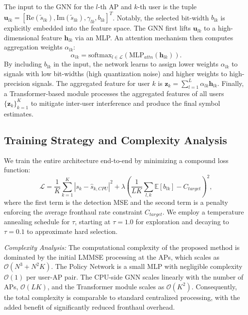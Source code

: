 The input to the GNN for the $l$-th AP and $k$-th user is the tuple $\mathbf{u}_{lk} = [\text{Re}(\tilde{s}_{lk}), \text{Im}(\tilde{s}_{lk}), \gamma_{lk}, b_{lk}]^T$. Notably, the selected bit-width $b_{lk}$ is explicitly embedded into the feature space. The GNN first lifts $\mathbf{u}_{lk}$ to a high-dimensional feature $\mathbf{h}_{lk}$ via an MLP. An attention mechanism then computes aggregation weights $\alpha_{lk}$:
\begin{equation}
    \alpha_{lk} = \text{softmax}_{l \in \mathcal{L}} \left( \text{MLP}_{attn}(\mathbf{h}_{lk}) \right).
\end{equation}
By including $b_{lk}$ in the input, the network learns to assign lower weights $\alpha_{lk}$ to signals with low bit-widths (high quantization noise) and higher weights to high-precision signals. The aggregated feature for user $k$ is $\mathbf{z}_k = \sum_{l=1}^L \alpha_{lk} \mathbf{h}_{lk}$. Finally, a Transformer-based module processes the aggregated features of all users $\{\mathbf{z}_k\}_{k=1}^K$ to mitigate inter-user interference and produce the final symbol estimates.

\subsection{Training Strategy and Complexity Analysis}
We train the entire architecture end-to-end by minimizing a compound loss function:
\begin{equation}
    \mathcal{L} = \frac{1}{K} \sum_{k=1}^K |s_k - \hat{s}_{k, CPU}|^2 + \lambda \left( \frac{1}{LK} \sum_{l,k} \mathbb{E}[b_{lk}] - C_{target} \right)^2,
\end{equation}
where the first term is the detection MSE and the second term is a penalty enforcing the average fronthaul rate constraint $C_{target}$. We employ a temperature annealing schedule for $\tau$, starting at $\tau=1.0$ for exploration and decaying to $\tau=0.1$ to approximate hard selection.

\textit{Complexity Analysis:} The computational complexity of the proposed method is dominated by the initial LMMSE processing at the APs, which scales as $\mathcal{O}(N^3 + N^2 K)$. The Policy Network is a small MLP with negligible complexity $\mathcal{O}(1)$ per user-AP pair. The CPU-side GNN scales linearly with the number of APs, $\mathcal{O}(L K)$, and the Transformer module scales as $\mathcal{O}(K^2)$. Consequently, the total complexity is comparable to standard centralized processing, with the added benefit of significantly reduced fronthaul overhead.